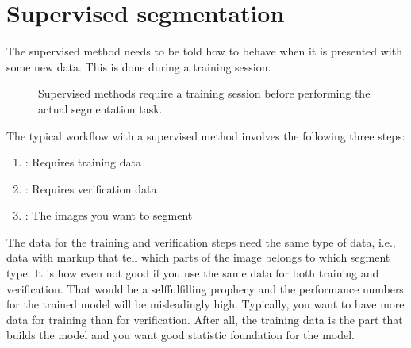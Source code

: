 \documentclass[letterpaper,10pt,english]{sphinxmanual}
\begin{document}
\begin{sphinxVerbatim}[commandchars=\\\{\}]
     
\end{sphinxVerbatim}


\chapter{Supervised segmentation}
\label{\detokenize{ML4NeutronImageSegmentation:supervised-segmentation}}
The supervised method needs to be told how to behave when it is presented with some new data. This is done during a training session.

\begin{figure}[htbp]
\centering
\capstart

\noindent{}
\caption{Supervised methods require a training session before performing the actual segmentation task.}\label{\detokenize{ML4NeutronImageSegmentation:id15}}\end{figure}



The typical workflow with a supervised method involves the following three steps:
\begin{enumerate}
%
\item {} 
: Requires training data

\item {} 
: Requires verification data

\item {} 
: The images you want to segment

\end{enumerate}

The data for the training and verification steps need the same type of data, i.e., data with markup that tell which parts of the image belongs to which segment type. It is how even not good if you use the same data for both training and verification. That would be a self\sphinxhyphen{}fulfilling prophecy and the performance numbers for the trained model will be misleadingly high. Typically, you want to have more data for training than for verification. After all, the training data is the part that builds the model and you want good statistic foundation for the model.
\end{document}
